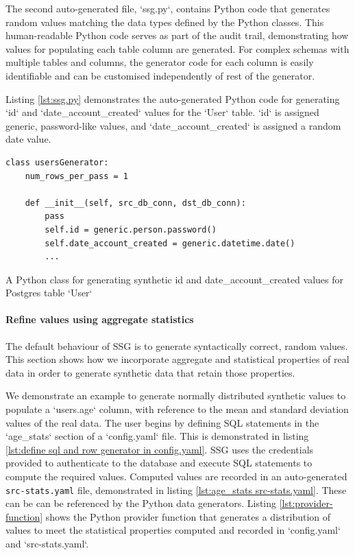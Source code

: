 \documentclass[11pt]{article}
\begin{document}
The second auto-generated file, `ssg.py`, contains Python code that generates random values matching the data types defined by the Python classes. This human-readable Python code serves as part of the audit trail, demonstrating how values for populating each table column are generated. For complex schemas with multiple tables and columns, the generator code for each column is easily identifiable and can be customised independently of rest of the generator. 

Listing \ref{lst:ssg.py} demonstrates the auto-generated Python code for generating `id` and `date\_account\_created` values for the `User` table. `id` is assigned generic, password-like values, and `date\_account\_created` is assigned a random date value.

\begin{listing}[H]
\begin{verbatim}
class usersGenerator:
    num_rows_per_pass = 1

    def __init__(self, src_db_conn, dst_db_conn):
        pass
        self.id = generic.person.password()
        self.date_account_created = generic.datetime.date()
        ...
\end{verbatim}
\caption{A Python class for generating synthetic id and date\_account\_created values for Postgres table `User`}
\label{lst:ssg.py}
\end{listing}

\paragraph{Refine values using aggregate statistics}

The default behaviour of SSG is to generate syntactically correct, random values. This section shows how we incorporate aggregate and statistical properties of real data in order to generate synthetic data that retain those properties. 

We demonstrate an example to generate normally distributed synthetic values to populate a `users.age` column, with reference to the mean and standard deviation values of the real data. The user begins by defining SQL statements in the `age\_stats` section of a `config.yaml` file. This is demonstrated in listing \ref{lst:define sql and row generator in config.yaml}. SSG uses the credentials provided to authenticate to the database and execute SQL statements to compute the required values. Computed values are recorded in an auto-generated \texttt{src-stats.yaml} file, demonstrated in listing \ref{lst:age_stats src-stats.yaml}. These can be can be referenced by the Python data generators. Listing \ref{lst:provider-function} shows the Python provider function that generates a distribution of values to meet the statistical properties computed and recorded in `config.yaml` and `src-stats.yaml`.
\end{document}
